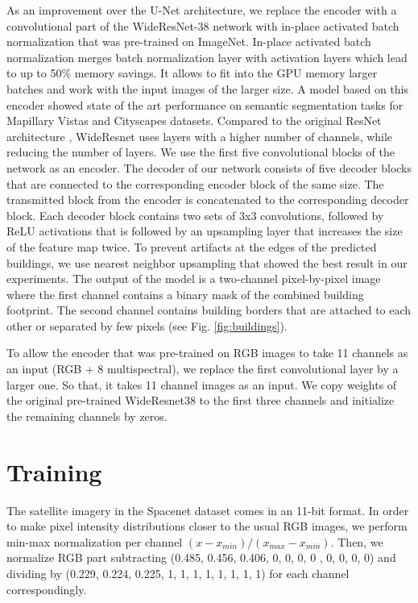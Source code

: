 \documentclass[10pt,twocolumn,letterpaper]{article}
\begin{document}
As an improvement over the U-Net architecture, we replace the encoder with a convolutional part of the WideResNet-38 network with in-place activated batch normalization \cite{bulo2017place} that was pre-trained on ImageNet. In-place activated batch normalization merges batch normalization layer with activation layers which lead to up to 50\% memory savings. It allows to fit into the GPU memory larger batches and work with the input images of the larger size.  A model based on this encoder showed state of the art performance on semantic segmentation tasks for Mapillary Vistas \cite{neuhold2017mapillary} and Cityscapes \cite{cordts2016cityscapes} datasets. Compared to the original ResNet architecture \cite{he2016deep}, WideResnet uses layers with a higher number of channels, while reducing the number of layers. We use the first five convolutional blocks of the network as an encoder. The decoder of our network consists of five decoder blocks that are connected to the corresponding encoder block of the same size. The transmitted block from the encoder is concatenated to the corresponding decoder block. Each decoder block contains two sets of 3x3 convolutions, followed by ReLU activations \cite{glorot2011deep} that is followed by an upsampling layer that increases the size of the feature map twice. To prevent artifacts at the edges of the predicted buildings, we use nearest neighbor upsampling that showed the best result in our experiments. The output of the model is a two-channel pixel-by-pixel image where the first channel contains a binary mask of the combined building footprint. The second channel contains building borders that are attached to each other or separated by few pixels (see Fig. \ref{fig:buildings}).

To allow the encoder that was pre-trained on RGB images to take 11 channels as an input (RGB + 8 multispectral), we replace the first convolutional layer by a larger one. So that, it takes 11 channel images as an input. We copy weights of the original pre-trained WideResnet38 to the first three channels and 
initialize the remaining channels by zeros. 


\section{Training}
The satellite imagery in the Spacenet dataset comes in an 11-bit format. In order to make pixel intensity distributions closer to the usual RGB images, we perform min-max normalization per channel $(x - x_{min}) / (x_{max} - x_{min})$. Then, we normalize RGB part subtracting (0.485, 0.456, 0.406, 0, 0, 0, 0 , 0, 0, 0, 0) and dividing by (0.229, 0.224, 0.225, 1, 1, 1, 1, 1, 1, 1, 1) for each channel correspondingly.
\end{document}
